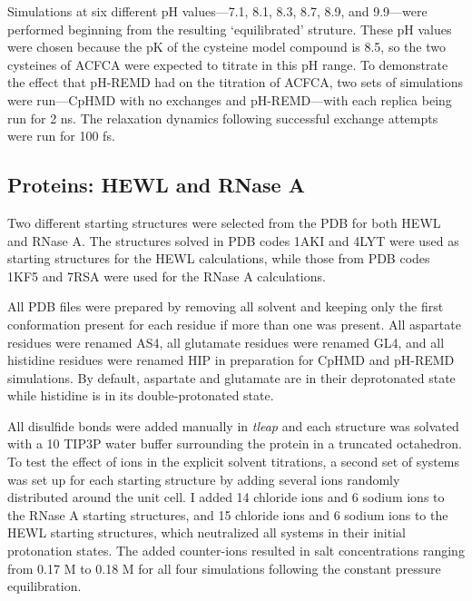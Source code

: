 Simulations at six different pH values---7.1, 8.1, 8.3, 8.7, 8.9, and 9.9---were
performed beginning from the resulting `equilibrated' struture.  These pH values
were chosen because the pK of the cysteine model compound is 8.5, so the
two cysteines of ACFCA were expected to titrate in this pH range.  To
demonstrate the effect that pH-REMD had on the titration of ACFCA, two sets of
simulations were run---CpHMD with no exchanges and pH-REMD---with each replica
being run for 2 ns. The relaxation dynamics following successful exchange
attempts were run for 100 fs.

\subsection{Proteins: HEWL and RNase A}

Two different starting structures were selected from the PDB for both HEWL and
RNase A. The structures solved in PDB codes 1AKI
\cite{Artymiuk_ActaCrystB_1982_v38_p778} and 4LYT
\cite{Young_JApplCryst_1993_v26_p309} were used as starting structures for the
HEWL calculations, while those from PDB codes 1KF5
\cite{Berisio_ActaCrystallogrD_2002_v58_p441} and 7RSA
\cite{Wlodawer_Biochemistry_1988_v27_p2705} were used for the RNase A
calculations.

All PDB files were prepared by removing all solvent and keeping only the first
conformation present for each residue if more than one was present. All
aspartate residues were renamed AS4, all glutamate residues were renamed GL4,
and all histidine residues were renamed HIP in preparation for CpHMD and pH-REMD
simulations. By default, aspartate and glutamate are in their deprotonated state
while histidine is in its double-protonated state.

All disulfide bonds were added manually in \emph{tleap} and each structure was
solvated with a 10 \text{\AA} TIP3P water buffer surrounding the protein in a
truncated octahedron. To test the effect of ions in the explicit solvent
titrations, a second set of systems was set up for each starting structure by
adding several ions randomly distributed around the unit cell. I added 14
chloride ions and 6 sodium ions to the RNase A starting structures, and 15
chloride ions and 6 sodium ions to the HEWL starting structures, which
neutralized all systems in their initial protonation states.  The added
counter-ions resulted in salt concentrations ranging from 0.17 M to 0.18 M for
all four simulations following the constant pressure equilibration.

